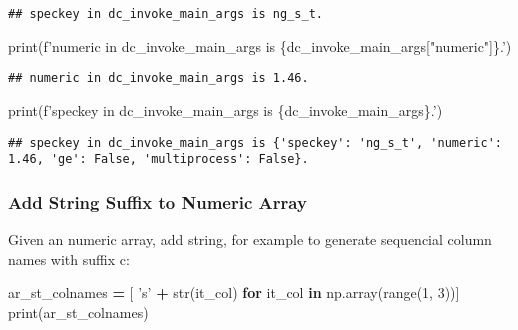 \documentclass[
]{book}
\newenvironment{Shaded}{\begin{snugshade}}{\end{snugshade}}
\newcommand{\BuiltInTok}[1]{#1}
\newcommand{\ControlFlowTok}[1]{\textcolor[rgb]{0.13,0.29,0.53}{\textbf{#1}}}
\newcommand{\DecValTok}[1]{\textcolor[rgb]{0.00,0.00,0.81}{#1}}
\newcommand{\KeywordTok}[1]{\textcolor[rgb]{0.13,0.29,0.53}{\textbf{#1}}}
\newcommand{\NormalTok}[1]{#1}
\newcommand{\OperatorTok}[1]{\textcolor[rgb]{0.81,0.36,0.00}{\textbf{#1}}}
\newcommand{\SpecialCharTok}[1]{\textcolor[rgb]{0.00,0.00,0.00}{#1}}
\newcommand{\SpecialStringTok}[1]{\textcolor[rgb]{0.31,0.60,0.02}{#1}}
\newcommand{\StringTok}[1]{\textcolor[rgb]{0.31,0.60,0.02}{#1}}
\begin{document}
\begin{verbatim}
## speckey in dc_invoke_main_args is ng_s_t.
\end{verbatim}

\begin{Shaded}
\begin{Highlighting}[]
\BuiltInTok{print}\NormalTok{(}\SpecialStringTok{f'numeric in dc_invoke_main_args is }\SpecialCharTok{\{}\NormalTok{dc_invoke_main_args[}\StringTok{"numeric"}\NormalTok{]}\SpecialCharTok{\}}\SpecialStringTok{.'}\NormalTok{)}
\end{Highlighting}
\end{Shaded}

\begin{verbatim}
## numeric in dc_invoke_main_args is 1.46.
\end{verbatim}

\begin{Shaded}
\begin{Highlighting}[]
\BuiltInTok{print}\NormalTok{(}\SpecialStringTok{f'speckey in dc_invoke_main_args is }\SpecialCharTok{\{}\NormalTok{dc_invoke_main_args}\SpecialCharTok{\}}\SpecialStringTok{.'}\NormalTok{)}
\end{Highlighting}
\end{Shaded}

\begin{verbatim}
## speckey in dc_invoke_main_args is {'speckey': 'ng_s_t', 'numeric': 1.46, 'ge': False, 'multiprocess': False}.
\end{verbatim}

\hypertarget{add-string-suffix-to-numeric-array}{%
\subsubsection{Add String Suffix to Numeric Array}\label{add-string-suffix-to-numeric-array}}

Given an numeric array, add string, for example to generate sequencial column names with suffix c:

\begin{Shaded}
\begin{Highlighting}[]
\NormalTok{ar_st_colnames }\OperatorTok{=}\NormalTok{ [ }\StringTok{'s'} \OperatorTok{+} \BuiltInTok{str}\NormalTok{(it_col) }\ControlFlowTok{for}\NormalTok{ it_col }\KeywordTok{in}\NormalTok{ np.array(}\BuiltInTok{range}\NormalTok{(}\DecValTok{1}\NormalTok{, }\DecValTok{3}\NormalTok{))]}
\BuiltInTok{print}\NormalTok{(ar_st_colnames)}
\end{Highlighting}
\end{Shaded}
\end{document}
